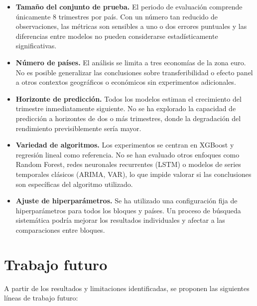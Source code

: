 \begin{itemize}
    \item \textbf{Tamaño del conjunto de prueba.} El periodo de evaluación comprende
    únicamente 8 trimestres por país. Con un número tan reducido de observaciones, las
    métricas son sensibles a uno o dos errores puntuales y las diferencias entre modelos
    no pueden considerarse estadísticamente significativas.

    \item \textbf{Número de países.} El análisis se limita a tres economías de la zona
    euro. No es posible generalizar las conclusiones sobre transferibilidad o efecto panel
    a otros contextos geográficos o económicos sin experimentos adicionales.

    \item \textbf{Horizonte de predicción.} Todos los modelos estiman el crecimiento del
    trimestre inmediatamente siguiente. No se ha explorado la capacidad de predicción a
    horizontes de dos o más trimestres, donde la degradación del rendimiento previsiblemente
    sería mayor.

    \item \textbf{Variedad de algoritmos.} Los experimentos se centran en XGBoost y
    regresión lineal como referencia. No se han evaluado otros enfoques como Random Forest,
    redes neuronales recurrentes (LSTM) o modelos de series temporales clásicos (ARIMA,
    VAR), lo que impide valorar si las conclusiones son específicas del algoritmo utilizado.

    \item \textbf{Ajuste de hiperparámetros.} Se ha utilizado una configuración fija de
    hiperparámetros para todos los bloques y países. Un proceso de búsqueda sistemática
    podría mejorar los resultados individuales y afectar a las comparaciones entre bloques.
\end{itemize}

\section{Trabajo futuro}

A partir de los resultados y limitaciones identificadas, se proponen las siguientes líneas
de trabajo futuro:

